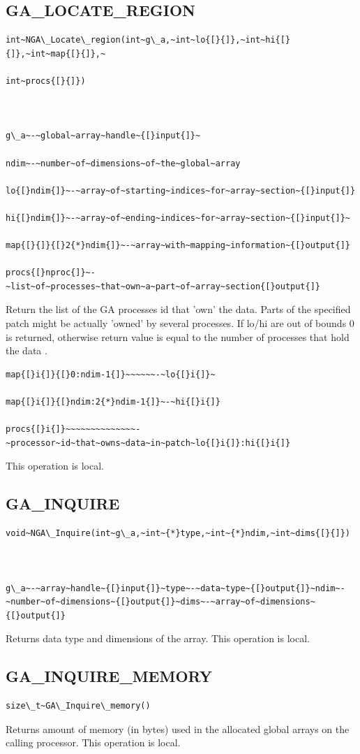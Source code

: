 \subsection*{\label{sub:GA_LOCATE_REGION}GA\_LOCATE\_REGION}
\begin{verbatim}
int~NGA\_Locate\_region(int~g\_a,~int~lo{[}{]},~int~hi{[}{]},~int~map{[}{]},~

int~procs{[}{]})



g\_a~-~global~array~handle~{[}input{]}~

ndim~-~number~of~dimensions~of~the~global~array

lo{[}ndim{]}~-~array~of~starting~indices~for~array~section~{[}input{]}

hi{[}ndim{]}~-~array~of~ending~indices~for~array~section~{[}input{]}~

map{[}{]}{[}2{*}ndim{]}~-~array~with~mapping~information~{[}output{]}

procs{[}nproc{]}~-~list~of~processes~that~own~a~part~of~array~section{[}output{]}
\end{verbatim}
Return the list of the GA processes id that 'own' the data. Parts
of the specified patch might be actually 'owned' by several processes.
If lo/hi are out of bounds \textquotedbl{}0\textquotedbl{} is returned,
otherwise return value is equal to the number of processes that hold
the data .
\begin{verbatim}
map{[}i{]}{[}0:ndim-1{]}~~~~~~-~lo{[}i{]}~

map{[}i{]}{[}ndim:2{*}ndim-1{]}~-~hi{[}i{]}

procs{[}i{]}~~~~~~~~~~~~~~-~processor~id~that~owns~data~in~patch~lo{[}i{]}:hi{[}i{]}
\end{verbatim}
This operation is local. 


\subsection*{\label{sub:GA_INQUIRE}GA\_INQUIRE}
\begin{verbatim}
void~NGA\_Inquire(int~g\_a,~int~{*}type,~int~{*}ndim,~int~dims{[}{]})



g\_a~-~array~handle~{[}input{]}~type~-~data~type~{[}output{]}~ndim~-~number~of~dimensions~{[}output{]}~dims~-~array~of~dimensions~{[}output{]}
\end{verbatim}
Returns data type and dimensions of the array. This operation is local. 


\subsection*{\label{sub:GA_INQUIRE_MEMORY}GA\_INQUIRE\_MEMORY}
\begin{verbatim}
size\_t~GA\_Inquire\_memory()
\end{verbatim}
Returns amount of memory (in bytes) used in the allocated global arrays
on the calling processor. This operation is local. 


